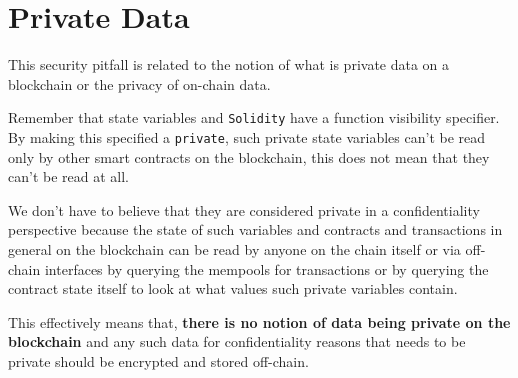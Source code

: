 \section{Private Data}\label{private-data}

This security pitfall is related to the notion of what is private data
on a blockchain or the privacy of on-chain data.

Remember that state variables and \texttt{Solidity} have a function
visibility specifier. By making this specified a \texttt{private}, such
private state variables can't be read only by other smart contracts on
the blockchain, this does not mean that they can't be read at all.

We don't have to believe that they are considered private in a
confidentiality perspective because the state of such variables and
contracts and transactions in general on the blockchain can be read by
anyone on the chain itself or via off-chain interfaces by querying the
mempools for transactions or by querying the contract state itself to
look at what values such private variables contain.

This effectively means that, \textbf{there is no notion of data being
private on the blockchain} and any such data for confidentiality reasons
that needs to be private should be encrypted and stored off-chain.
